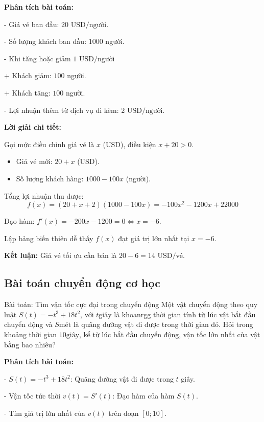 \documentclass[12pt,a4paper]{article}
\begin{document}
\noindent\textbf{Phân tích bài toán:}

- Giá vé ban đầu: $20 \text{ USD/người}$.

- Số lượng khách ban đầu: $1000$ người.

- Khi tăng hoặc giảm $1 \text{ USD/người}$

+ Khách giảm: $100$ người.

+ Khách tăng: $100$ người.

- Lợi nhuận thêm từ dịch vụ đi kèm: $2 \text{ USD/người}$.

\noindent\textbf{Lời giải chi tiết:}

Gọi mức điều chỉnh giá vé là $x$ ($\text{USD}$), điều kiện $x + 20 > 0$.
\begin{itemize}
    \item Giá vé mới: $20 + x$ ($\text{USD}$).
    \item Số lượng khách hàng: $1000 - 100x$ (người).
\end{itemize}

Tổng lợi nhuận thu được:
\[ f(x) = (20 + x + 2)(1000 - 100x) = -100x^2 - 1200x + 22000 \]

Đạo hàm: $f'(x) = -200x - 1200 = 0 \iff x = -6$.

Lập bảng biến thiên dễ thấy $f(x)$ đạt giá trị lớn nhất tại $x = -6$.

\noindent\textbf{Kết luận:} Giá vé tối ưu cần bán là $20 - 6 = 14\text{ USD/vé}$.

\subsection{Bài toán chuyển động cơ học}

\begin{problembox}{Bài toán: Tìm vận tốc cực đại trong chuyển động}
Một vật chuyển động theo quy luật $S(t) = -t^3+ 18t^2$, với $t\text{giây}$ là khoanrgg thời gian tính từ lúc vật bắt đầu chuyển động và $S \text{mét}$ là quãng đường vật đi được trong thời gian đó. Hỏi trong khoảng thời gian $10 \text{giây}$, kể từ lúc bắt đầu chuyển động, vận tốc lớn nhất của vật bằng bao nhiêu?
\end{problembox}

\noindent\textbf{Phân tích bài toán:}

- $S(t) = -t^3 + 18t^2$: Quãng đường vật đi được trong $t$ giây.

- Vận tốc tức thời $v(t)=S'(t)$: Đạo hàm của hàm $S(t)$.

- Tím giá trị lớn nhất của $v(t)$ trên đoạn $[0 ; 10]$.
\end{document}
